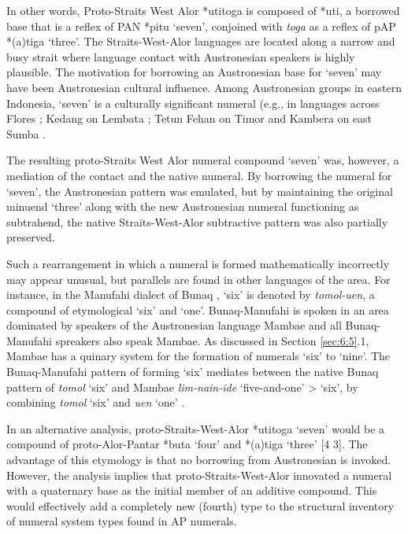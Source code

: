 \documentclass[output=paper]{LSP/langsci}
\begin{document}
In other words, Proto-Straits West Alor *{\texthtb}utitoga is composed of *{\texthtb}uti, a borrowed base that is a reflex of PAN *pitu `seven', conjoined with \textit{toga} as a reflex of pAP *(a)tiga `three'. The Straits-West-Alor languages are located along a narrow and busy strait where language contact with Austronesian speakers is highly plausible. The motivation for borrowing an Austronesian base for `seven' may have been Austronesian cultural influence. Among Austronesian groups in eastern Indonesia, `seven' is a culturally significant numeral (e.g., in languages across Flores \citep[221]{Forth2004}; Kedang on Lembata \citep[14-18]{Barnes1982}; Tetun Fehan on Timor \citep[102]{VanKlinken1999} and Kambera on east Sumba \citep[212-213]{Forth1981}.

The resulting proto-Straits West Alor numeral compound `seven' was, however, a mediation of the contact and the native numeral. By borrowing the numeral for `seven', the Austronesian pattern was emulated, but by maintaining the original minuend `three' along with the new Austronesian numeral functioning as subtrahend, the native Straits-West-Alor subtractive pattern was also partially preserved. 

Such a rearrangement in which a numeral is formed mathematically incorrectly may appear unusual, but parallels are found in other languages of the area. For instance, in the Manufahi dialect of Bunaq \citep[a language related to the Alor-Pantar languages spoken on Timor][]{Schapper2010}, `six' is denoted by \textit{tomol-uen}, a compound of etymological `six' and `one'. Bunaq-Manufahi is spoken in an area dominated by speakers of the Austronesian language Mambae and all Bunaq-Manufahi spreakers also speak Mambae. As discussed in Section \ref{sec:6:5}.1, Mambae has a quinary system for the formation of numerals `six' to `nine'. The Bunaq-Manufahi pattern of forming `six' mediates between the native Bunaq pattern of \textit{tomol} `six' and Mambae \textit{lim-nain-ide} `five-and-one' {\textgreater} `six', by combining \textit{tomol} `six' and \textit{uen} `one' .

In an alternative analysis, proto-Straits-West-Alor *{\texthtb}utitoga `seven' would be a compound of proto-Alor-Pantar *buta `four' and *(a)tiga `three' [4 3]. The advantage of this etymology is that no borrowing from Austronesian is invoked. However, the analysis implies that proto-Straits-West-Alor innovated a numeral with a quaternary base as the initial member of an additive compound. This would effectively add a completely new (fourth) type to the structural inventory of numeral system types found in AP numerals. 
\end{document}
